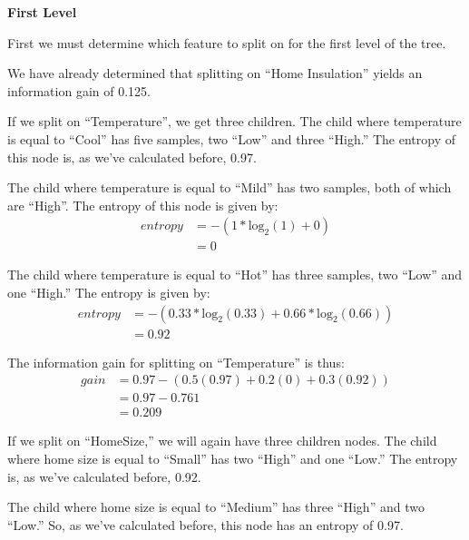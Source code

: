 \documentclass[11pt]{article}
\begin{document}
\begin{enumerate}
\begin{enumerate}
                \textbf{First Level}

                First we must determine which feature to split on for the first
                level of the tree.

                We have already determined that splitting on ``Home
                Insulation'' yields an information gain of 0.125.

                If we split on ``Temperature'', we get three children. The
                child where temperature is equal to ``Cool'' has five samples,
                two ``Low'' and three ``High.'' The entropy of this node is,
                as we've calculated before, 0.97.

                The child where temperature is equal to ``Mild'' has two
                samples, both of which are ``High''. The entropy of this node
                is given by:
                \begin{align*}
                    entropy & = - (1 * \text{log}_2(1) + 0) \\
                            & = 0
                \end{align*}

                The child where temperature is equal to ``Hot'' has three
                samples, two ``Low'' and one ``High.'' The entropy is given by:
                \begin{align*}
                    entropy & = - (0.33 * \text{log}_2(0.33) + 0.66 * \text{log}_2(0.66)) \\
                    & = 0.92
                \end{align*}

                The information gain for splitting on ``Temperature'' is thus:
                \begin{align*}
                    gain &= 0.97 - \left(0.5(0.97) + 0.2(0) + 0.3(0.92)\right) \\
                    & = 0.97 - 0.761 \\
                    & = 0.209
                \end{align*}

                If we split on ``HomeSize,'' we will again have three children
                nodes. The child where home size is equal to ``Small'' has two
                ``High'' and one ``Low.'' The entropy is, as we've calculated
                before, 0.92.

                The child where home size is equal to ``Medium'' has three
                ``High'' and two ``Low.'' So, as we've calculated before, this
                node has an entropy of 0.97.


\end{enumerate}
\end{enumerate}
\end{document}
